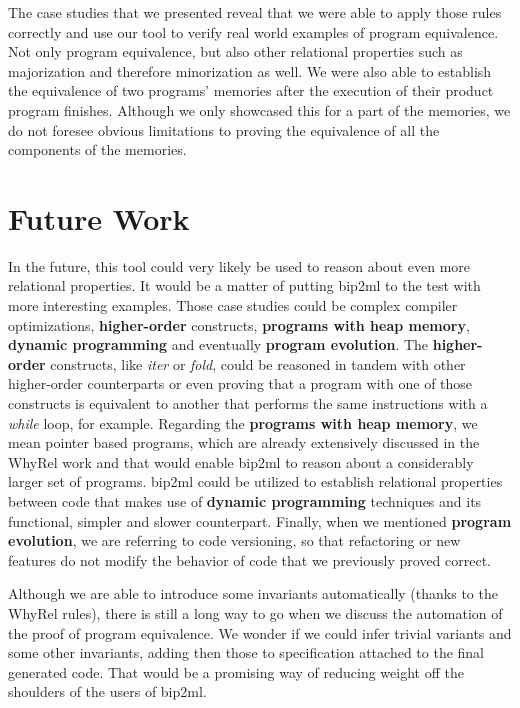 The case studies that we presented reveal that we were able to apply those rules correctly and use our tool to verify real world examples of program equivalence.
Not only program equivalence, but also other relational properties such as majorization and therefore minorization as well.
We were also able to establish the equivalence of two programs' memories after the execution of their product program finishes.
Although we only showcased this for a part of the memories, we do not foresee obvious limitations to proving the equivalence of all the components of the memories.


\section{Future Work}
\label{sec:future}

In the future, this tool could very likely be used to reason about even more relational properties.
It would be a matter of putting bip2ml to the test with more interesting examples.
Those case studies could be complex compiler optimizations, \textbf{higher-order} constructs, \textbf{programs with heap memory}, \textbf{dynamic programming} and eventually \textbf{program evolution}.
The \textbf{higher-order} constructs, like \emph{iter} or \emph{fold}, could be reasoned in tandem with other higher-order counterparts or even proving that a program with one of those constructs is equivalent to another that performs the same instructions with a \emph{while} loop, for example. 
Regarding the \textbf{programs with heap memory}, we mean pointer based programs, which are already extensively discussed in the WhyRel work and that would enable bip2ml to reason about a considerably larger set of programs.
bip2ml could be utilized to establish relational properties between code that makes use of \textbf{dynamic programming} techniques and its functional, simpler and slower counterpart.
Finally, when we mentioned \textbf{program evolution}, we are referring to code versioning, so that refactoring or new features do not modify the behavior of code that we previously proved correct.

Although we are able to introduce some invariants automatically (thanks to the WhyRel rules), there is still a long way to go when we discuss the automation of the proof of program equivalence.
We wonder if we could infer trivial variants and some other invariants, adding then those to specification attached to the final generated code.
That would be a promising way of reducing weight off the shoulders of the users of bip2ml.
